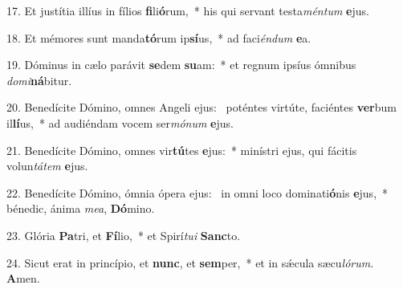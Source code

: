 17. Et justítia illíus in fílios \textbf{fi}li\textbf{ó}rum,~*  his qui servant testa\textit{mén}\textit{tum} \textbf{e}jus.\

18. Et mémores sunt manda\textbf{tó}rum ip\textbf{sí}us,~*  ad faci\textit{én}\textit{dum} \textbf{e}a.\

19. Dóminus in cælo parávit \textbf{se}dem \textbf{su}am:~*  et regnum ipsíus ómnibus \textit{do}\textit{mi}\textbf{ná}bitur.\

20. Benedícite Dómino, omnes Angeli ejus: \dag\  poténtes virtúte, faciéntes \textbf{ver}bum il\textbf{lí}us,~*  ad audiéndam vocem ser\textit{mó}\textit{num} \textbf{e}jus.\

21. Benedícite Dómino, omnes vir\textbf{tú}tes \textbf{e}jus:~*  minístri ejus, qui fácitis volun\textit{tá}\textit{tem} \textbf{e}jus.\

22. Benedícite Dómino, ómnia ópera ejus: \dag\  in omni loco dominati\textbf{ó}nis \textbf{e}jus,~*  bénedic, ánima \textit{me}\textit{a}, \textbf{Dó}mino.\

23. Glória \textbf{Pa}tri, et \textbf{Fí}lio,~*  et Spirí\textit{tu}\textit{i} \textbf{Sanc}to.\

24. Sicut erat in princípio, et \textbf{nunc}, et \textbf{sem}per,~*  et in sǽcula sæcu\textit{ló}\textit{rum}. \textbf{A}men.\

